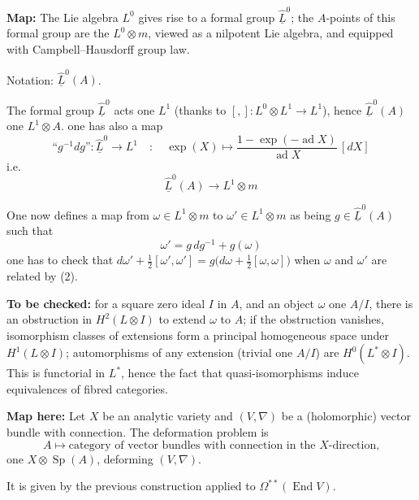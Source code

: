 \documentclass[11pt,a4paper]{article}
\DeclareMathOperator{\End}{End}
\DeclareMathOperator{\Sp}{Sp}
\DeclareMathOperator{\ad}{ad}
\begin{document}
\vspace{0.2cm}

\noindent\textbf{Map:} The Lie algebra $L^0$ gives rise to a formal group $\widehat{\underline{L}}^0$; the $A$-points of this formal group are the $L^0 \otimes m$, viewed as a nilpotent Lie algebra, and equipped with Campbell--Hausdorff group law.

\noindent Notation: $\widehat{\underline{L}}^0(A)$.

\newpage

The formal group $\widehat{\underline{L}}^0$ acts one $L^1$ (thanks to $[,]\colon L^0 \otimes L^1 \to L^1$), hence $\widehat{\underline{L}}^0(A)$ one $L^1 \otimes A$. one has also a map
\[
\text{``}g^{-1}dg\text{''}\colon \widehat{\underline{L}}^0 \longrightarrow L^1 \quad\colon\quad \exp(X) \longmapsto \frac{1-\exp(-\ad X)}{\ad X}\,[dX]
\]
i.e.
\[
\widehat{\underline{L}}^0(A) \longrightarrow L^1 \otimes m
\]

One now defines a map from $\omega \in L^1 \otimes m$ to $\omega' \in L^1 \otimes m$ as being $g \in \widehat{\underline{L}}^0(A)$ such that
\begin{equation}\label{eq:2}
\omega' = g\,dg^{-1} + g(\omega)
\end{equation}
one has to check that $d\omega' + \frac{1}{2}[\omega',\omega'] = g\bigl(d\omega + \frac{1}{2}[\omega,\omega]\bigr)$ when $\omega$ and $\omega'$ are related by (2).

\vspace{0.3cm}

\noindent\textbf{To be checked:} for a square zero ideal $I$ in $A$, and an object $\omega$ one $A/I$, there is an obstruction in $H^2(L \otimes I)$ to extend $\omega$ to $A$; if the obstruction vanishes, isomorphism classes of extensions form a principal homogeneous space under $H^1(L \otimes I)$; automorphisms of any extension (trivial one $A/I$) are $H^0(L^* \otimes I)$. This is functorial in $L^*$, hence the fact that quasi-isomorphisms induce equivalences of fibred categories.

\vspace{0.3cm}

\noindent\textbf{Map here:} Let $X$ be an analytic variety and $(V,\nabla)$ be a (holomorphic) vector bundle with connection. The deformation problem is
\[
A \longmapsto \text{category of vector bundles with connection in the $X$-direction,}
\]
one $X \otimes \Sp(A)$, deforming $(V,\nabla)$.

It is given by the previous construction applied to $\Omega^{**}(\End V)$.
\end{document}
